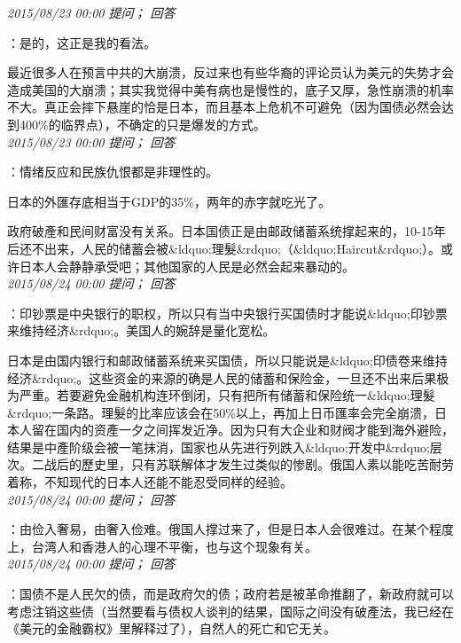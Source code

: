 \documentclass[twocolumn]{ctexart}
\begin{document}
\textit{\hfill\noindent\small 2015/08/23 00:00 提问； 回答}

：是的，这正是我的看法。

最近很多人在预言中共的大崩溃，反过来也有些华裔的评论员认为美元的失势才会造成美国的大崩溃；其实我觉得中美有病也是慢性的，底子又厚，急性崩溃的机率不大。真正会摔下悬崖的恰是日本，而且基本上危机不可避免（因为国债必然会达到400\%的临界点），不确定的只是爆发的方式。\\

\textit{\hfill\noindent\small 2015/08/23 00:00 提问； 回答}

：情绪反应和民族仇恨都是非理性的。

日本的外匯存底相当于GDP的35\%，两年的赤字就吃光了。

政府破產和民间财富没有关系。日本国债正是由邮政储蓄系统撑起来的，10-15年后还不出来，人民的储蓄会被\&ldquo;理髮\&rdquo;（\&ldquo;Haircut\&rdquo;）。或许日本人会静静承受吧；其他国家的人民是必然会起来暴动的。\\

\textit{\hfill\noindent\small 2015/08/24 00:00 提问； 回答}

：印钞票是中央银行的职权，所以只有当中央银行买国债时才能说\&ldquo;印钞票来维持经济\&rdquo;。美国人的婉辞是量化宽松。

日本是由国内银行和邮政储蓄系统来买国债，所以只能说是\&ldquo;印债卷来维持经济\&rdquo;。这些资金的来源的确是人民的储蓄和保险金，一旦还不出来后果极为严重。若要避免金融机构连环倒闭，只有把所有储蓄和保险统一\&ldquo;理髮\&rdquo;一条路。理髮的比率应该会在50\%以上，再加上日币匯率会完全崩溃，日本人留在国内的资產一夕之间挥发近净。因为只有大企业和财阀才能到海外避险，结果是中產阶级会被一笔抹消，国家也从先进行列跌入\&ldquo;开发中\&rdquo;层次。二战后的歷史里，只有苏联解体才发生过类似的惨剧。俄国人素以能吃苦耐劳着称，不知现代的日本人还能不能忍受同样的经验。\\

\textit{\hfill\noindent\small 2015/08/24 00:00 提问； 回答}

：由俭入奢易，由奢入俭难。俄国人撑过来了，但是日本人会很难过。在某个程度上，台湾人和香港人的心理不平衡，也与这个现象有关。\\

\textit{\hfill\noindent\small 2015/08/24 00:00 提问； 回答}

：国债不是人民欠的债，而是政府欠的债；政府若是被革命推翻了，新政府就可以考虑注销这些债（当然要看与债权人谈判的结果，国际之间没有破產法，我已经在《美元的金融霸权》里解释过了），自然人的死亡和它无关。
\end{document}
